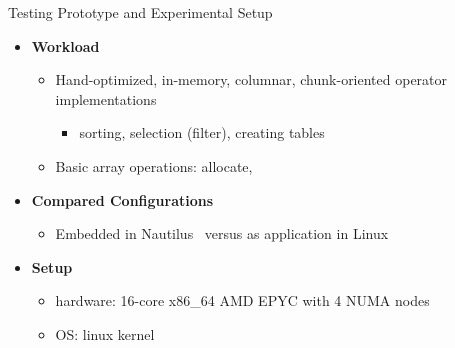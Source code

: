 \begin{block}{Testing Prototype and Experimental Setup}
  \begin{itemize}
    \item \textbf{Workload}
      \begin{itemize}
      \item Hand-optimized, in-memory, columnar, chunk-oriented operator
        implementations
    \begin{itemize}
    \item sorting, selection (filter), creating tables
    \end{itemize}
  \item Basic array operations: allocate, 
  \end{itemize}
   \item \textbf{Compared Configurations}
    \begin{itemize}
    \item Embedded in Nautilus~\cite{HALE:2015:NAUTILUS} versus as application in Linux 
    \end{itemize}
  \item \textbf{Setup}
    \begin{itemize}
    \item hardware: 16-core x86\_64 AMD EPYC with 4 NUMA nodes
    \item OS: linux kernel 
    \end{itemize}
  \end{itemize}
\end{block}
